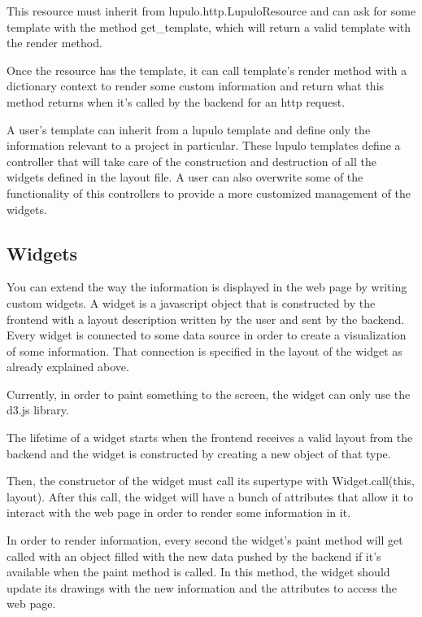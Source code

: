 \documentclass[12pt]{article}
\begin{document}
            This resource must inherit from lupulo.http.LupuloResource and can
            ask for some template with the method get\_template, which will
            return a valid template with the render method.

            Once the resource has the template, it can call template's render
            method with a dictionary context to render some custom information
            and return what this method returns when it's called by the backend
            for an http request.

            A user's template can inherit from a lupulo template and define only
            the information relevant to a project in particular. These lupulo
            templates define a controller that will take care of the
            construction and destruction of all the widgets defined in the
            layout file. A user can also overwrite some of the functionality of
            this controllers to provide a more customized management of the
            widgets.

        \subsection{Widgets}
            You can extend the way the information is displayed in the web page
            by writing custom widgets. A widget is a javascript object that is
            constructed by the frontend with a layout description written by the
            user and sent by the backend. Every widget is connected to some data
            source in order to create a visualization of some information. That
            connection is specified in the layout of the widget as already
            explained above.

            Currently, in order to paint something to the screen, the widget can
            only use the d3.js library.

            The lifetime of a widget starts when the frontend receives a valid
            layout from the backend and the widget is constructed by creating a
            new object of that type.
            
            Then, the constructor of the widget must call its supertype with
            Widget.call(this, layout). After this call, the widget will have a
            bunch of attributes that allow it to interact with the web page in
            order to render some information in it.

            In order to render information, every second the widget's paint
            method will get called with an object filled with the new data
            pushed by the backend if it's available when the paint method is
            called. In this method, the widget should update its drawings with
            the new information and the attributes to access the web page.
\end{document}
